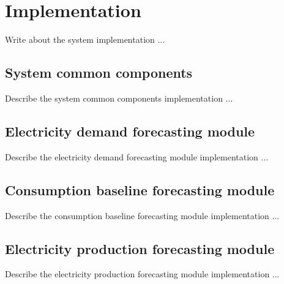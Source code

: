 \chapter{Implementation}
\label{cha:implementation}
\vspace{0.4 cm}

Write about the system implementation ...


\section{System common components}
\label{sec:componentsimpl}
\vspace{0.2 cm}

Describe the system common components implementation ...


\section{Electricity demand forecasting module}
\label{sec:demandimpl}
\vspace{0.2 cm}

Describe the electricity demand forecasting module implementation ...


\section{Consumption baseline forecasting module}
\label{sec:baselineimpl}
\vspace{0.2 cm}

Describe the consumption baseline forecasting module implementation ...


\section{Electricity production forecasting module}
\label{sec:productionimpl}
\vspace{0.2 cm}

Describe the electricity production forecasting module implementation ...
